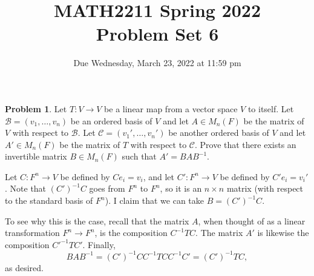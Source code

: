 \documentclass[11pt,oneside]{amsart}
\title{MATH2211 Spring 2022\\
Problem Set 6}
\author{Due Wednesday, March 23, 2022 at 11:59 pm}
\theoremstyle{definition}
\newtheorem{problem}{Problem}
\begin{document}
    \maketitle
    
    \begin{problem}
        Let $T\colon V\to V$ be a linear map from a vector space $V$ to itself. Let $\mathcal B=(v_1,\dots,v_n)$ be an ordered basis of $V$ and let $A\in M_n(F)$ be the matrix of $V$ with respect to $\mathcal B$. Let $\mathcal C=(v_1',\dots,v_n')$ be another ordered basis of $V$ and let $A'\in M_n(F)$ be the matrix of $T$ with respect to $\mathcal C$. Prove that there exists an invertible matrix $B\in M_n(F)$ such that $A'=BAB^{-1}$.
    \end{problem}
    \begin{solution}
        Let $C\colon F^n\to V$ be defined by $Ce_i=v_i$, and let $C'\colon F^n\to V$ be defined by $C'e_i=v_i'$. Note that $(C')^{-1}C$ goes from $F^n$ to $F^n$, so it is an $n\times n$ matrix (with respect to the standard basis of $F^n$). I claim that we can take $B=(C')^{-1}C$.

        To see why this is the case, recall that the matrix $A$, when thought of as a linear transformation $F^n\to F^n$, is the composition $C^{-1}TC$. The matrix $A'$ is likewise the composition $C'^{-1}TC'$. Finally,
        \[BAB^{-1}=(C')^{-1}CC^{-1}TCC^{-1}C'=(C')^{-1}TC,\]
        as desired.
    \end{solution}
\end{document}
